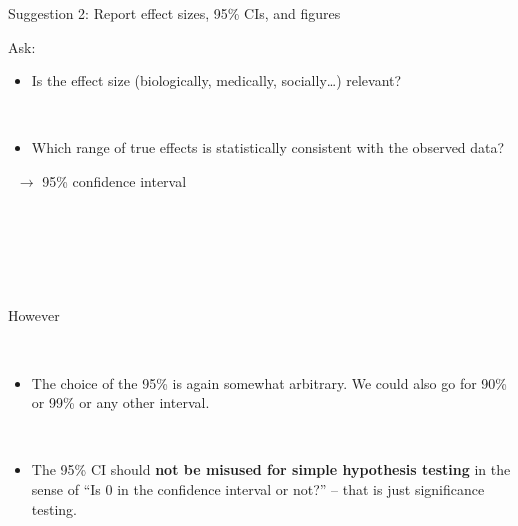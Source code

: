 \documentclass[
  10pt,
  ignorenonframetext,
]{beamer}
\providecommand{\tightlist}{%
  \setlength{\itemsep}{0pt}\setlength{\parskip}{0pt}}
\begin{document}
\begin{frame}
\begin{block}{Suggestion 2: Report effect sizes, 95\% CIs, and figures}
\protect\hypertarget{suggestion-2-report-effect-sizes-95-cis-and-figures}{}
\(~\)

Ask:

\vspace{2mm}

\begin{itemize}
\tightlist
\item
  Is the effect size (biologically, medically, socially\ldots) relevant?
\end{itemize}

\(~\)

\begin{itemize}
\tightlist
\item
  Which range of true effects is statistically consistent with the
  observed data?
\end{itemize}

\(~\) \centering \(\rightarrow\) 95\% confidence interval

\(~\)

\(~\)

\flushleft

\(~\)

\scriptsize

However

\(~\)

\begin{itemize}
\tightlist
\item
  The choice of the 95\% is again somewhat arbitrary. We could also go
  for 90\% or 99\% or any other interval.
\end{itemize}

\(~\)

\begin{itemize}
\tightlist
\item
  The 95\% CI should \textbf{not be misused for simple hypothesis
  testing} in the sense of ``Is 0 in the confidence interval or not?''
  -- that is just significance testing.
\end{itemize}
\end{block}
\end{frame}
\end{document}
